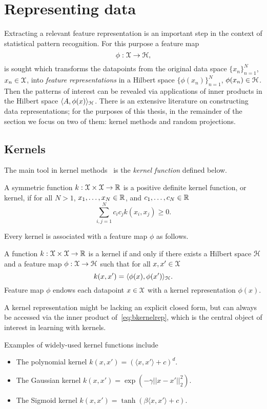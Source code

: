 \section{Representing data}
\label{sec:b-representing-data}
Extracting a relevant feature representation is an important step in the context of statistical pattern recognition. For this purpose a feature map 
\[
\phi: \mathcal{X} \rightarrow \mathcal{H},
\]
is sought which transforms the datapoints from the original data space $\{x_n\}_{n=1}^{N}$, $x_n \in \mathcal{X}$, into \emph{feature representations} in a Hilbert space $\{\phi(x_n)\}_{n=1}^{N}$, $\phi(x_n) \in \mathcal{H}$. Then the patterns of interest can be revealed via applications of inner products in the Hilbert space $\langle A, \phi(x) \rangle_{\mathcal{H}}$. There is an extensive literature on constructing data representations; for the purposes of this thesis, in the remainder of the section we focus on two of them: kernel methods and random projections.


\subsection{Kernels}
\label{subsec:b-kernels}

The main tool in kernel methods~\cite{scholkopf02} is the \emph{kernel function} defined below.
\begin{ndefn} \label{def:bkernelfun}
	A symmetric function $k: \mathcal{X} \times \mathcal{X} \rightarrow \mathbb{R} $ is a positive definite kernel function, or kernel, if for all $N>1$, $x_1, \ldots, x_N \in \mathbb{R}$, and $c_1, \ldots, c_N \in \mathbb{R}$ 
	\[
	\sum_{i,j=1}^{N} c_ic_j k(x_i, x_j) \geq 0.
	\]
\end{ndefn}
Every kernel is associated with a feature map $\phi$ as follows.
\begin{ndefn} \label{def:bkernelrepr}
	 A function $k: \mathcal{X} \times \mathcal{X} \rightarrow \mathbb{R}$ is a kernel if and only if there exists a Hilbert space $\mathcal{H}$ and a feature map $\phi: \mathcal{X} \rightarrow \mathcal{H}$ such that for all $x, x' \in \mathcal{X}$
	 \[
	 \label{eq:bkernelrep}
	 k(x,x') = \langle \phi(x), \phi(x') \rangle_{\mathcal{H}}.
	 \]
	 Feature map $\phi$ endows each datapoint $x \in \mathcal{X}$ with a kernel representation $\phi(x)$.
\end{ndefn}
A kernel representation might be lacking an explicit closed form, but can always be accessed via the inner product of~\cref{eq:bkernelrep}, which is the central object of interest in learning with kernels.

Examples of widely-used kernel functions include
\begin{itemize}
	\item The polynomial kernel $k(x,x') = \left(\langle x, x'\rangle + c\right)^d$.
	\item The Gaussian kernel $k(x,x') = \exp(-\gamma||x-x'||_{2}^2)$.
	\item The Sigmoid kernel $k(x,x') = \tanh(\beta\langle x, x'\rangle + c)$.
\end{itemize}

